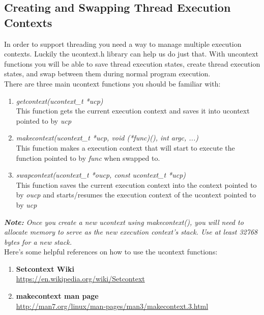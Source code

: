 \documentclass{article}
\begin{document}
\subsection{Creating and Swapping Thread Execution Contexts}
In order to support threading you need a way to manage multiple execution contexts. Luckily the ucontext.h library can help us do just that. With uncontext functions you will be able to save thread execution states, create thread execution states, and swap between them during normal program execution.\\

\noindent There are three main ucontext functions you should be familiar with:
\begin{enumerate}
\item \textit{getcontext(ucontext\_t *ucp)}\\
	This function gets the current execution context and saves it into ucontext pointed to by \textit{ucp}
\item \textit{makecontext(ucontext\_t *ucp, void (*func)(), int argc, ...)}\\
	This function makes a execution context that will start to execute the function pointed to by \textit{func} when swapped to.
\item \textit{swapcontext(ucontext\_t *oucp, const ucontext\_t *ucp)}\\
	This function saves the current execution context into the context pointed to by \textit{oucp} and starts/resumes the
	execution context of the ucontext pointed to by \textit{ucp}
\end{enumerate}

\noindent \textit{\textbf{Note:} Once you create a new ucontext using makecontext(), you will need to allocate memory to serve as the new execution context’s stack. Use at least 32768 bytes for a new stack.}\\

\noindent Here’s some helpful references on how to use the ucontext functions:
\begin{enumerate}
\item \textbf{Setcontext Wiki} \\ \href{https://en.wikipedia.org/wiki/Setcontext}{https://en.wikipedia.org/wiki/Setcontext}
\item \textbf{makecontext man page} \\ \href{http://man7.org/linux/man-pages/man3/makecontext.3.html}{http://man7.org/linux/man-pages/man3/makecontext.3.html}
\end{enumerate}
\end{document}
